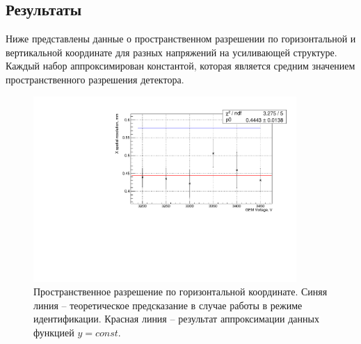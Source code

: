 \subsection{Результаты}
Ниже представлены данные о пространственном разрешении по горизонтальной и вертикальной координате для разных напряжений на усиливающей структуре. Каждый набор аппроксимирован константой, которая является средним значением пространственного разрешения детектора. 
\begin{figure}[h]
	\centering
	\includegraphics[width= 10cm]{img/x_sp_res.pdf}
	\caption{Пространственное разрешение по горизонтальной координате. Синяя линия -- теоретическое предсказание в случае работы в режиме идентификации. Красная линия -- результат аппроксимации данных функцией $y = const$.}
	\label{fig:x_sp_res}
\end{figure}

